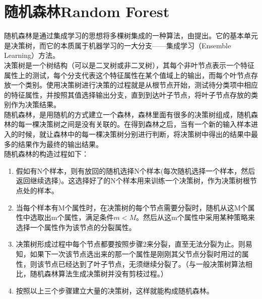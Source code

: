\documentclass[a4paper]{article}
\begin{document}
\section{随机森林Random Forest}

随机森林是通过集成学习的思想将多棵树集成的一种算法，由\textcite{RN6164}提出。它的基本单元是决策树，而它的本质属于机器学习的一大分支——集成学习（Ensemble Learning）方法。\\

决策树是一个树结构（可以是二叉树或非二叉树），其每个非叶节点表示一个特征属性上的测试，每个分支代表这个特征属性在某个值域上的输出，而每个叶节点存放一个类别。使用决策树进行决策的过程就是从根节点开始，测试待分类项中相应的特征属性，并按照其值选择输出分支，直到到达叶子节点，将叶子节点存放的类别作为决策结果。\\

随机森林，是用随机的方式建立一个森林，森林里面有很多的决策树组成，随机森林的每一棵决策树之间是没有关联的。在得到森林之后，当有一个新的输入样本进入的时候，就让森林中的每一棵决策树分别进行判断，将决策树中得出的结果中最多的结果作为最终的输出结果。\\

随机森林的构造过程如下：

\begin{enumerate}
	\item 假如有N个样本，则有放回的随机选择N个样本(每次随机选择一个样本，然后返回继续选择)。这选择好了的N个样本用来训练一个决策树，作为决策树根节点处的样本。
	\item 当每个样本有M个属性时，在决策树的每个节点需要分裂时，随机从这M个属性中选取出m个属性，满足条件$m<M$。然后从这m个属性中采用某种策略来选择一个属性作为该节点的分裂属性。
	\item 决策树形成过程中每个节点都要按照步骤2来分裂，直至无法分裂为止。则易知，如果下一次该节点选出来的那一个属性是刚刚其父节点分裂时用过的属性，则该节点已经达到了叶子节点，无须继续分裂了。（与一般决策树算法相比，随机森林算法生成决策树并没有剪枝过程。）
	\item 按照以上三个步骤建立大量的决策树，这样就能构成随机森林。
\end{enumerate}
\end{document}
